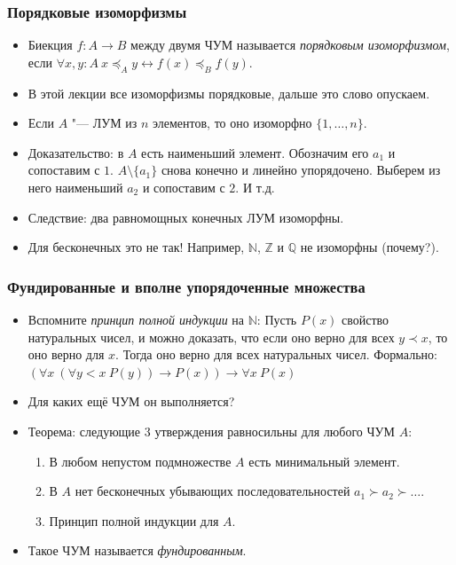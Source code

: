 \documentclass[10pt]{beamer}
\begin{document}
\begin{frame}
    \frametitle{Порядковые изоморфизмы}
\begin{itemize}
    \item Биекция \(f: A \to B\) между двумя ЧУМ называется \emph{порядковым изоморфизмом}, если \( \forall x,y:A ~ x \preccurlyeq_A y \leftrightarrow f(x) \preccurlyeq_B f(y) \).
    \item В этой лекции все изоморфизмы порядковые, дальше это слово опускаем.
    \pause
    \item Если $A$ "--- ЛУМ из $n$ элементов, то оно изоморфно \(\{1,\ldots,n\}\).
    \pause
    \item Доказательство: в $A$ есть наименьший элемент. Обозначим его $a_1$ и сопоставим с $1$. $A \setminus \{a_1\}$ снова конечно и линейно упорядочено. \pause Выберем из него наименьший $a_2$ и сопоставим с $2$. И т.д.
    \pause
    \item Следствие: два равномощных конечных ЛУМ изоморфны.
    \item Для бесконечных это не так! Например, \pause \(\mathbb{N}\), \(\mathbb{Z}\) и \(\mathbb{Q}\) не изоморфны (почему?).
\end{itemize}
\end{frame}

\begin{frame}
    \frametitle{Фундированные и вполне упорядоченные множества}
    \begin{itemize}
        \item Вспомните \emph{принцип полной индукции} на \(\mathbb{N}\): \pause Пусть \(P(x)\) свойство натуральных чисел, и можно доказать, что если оно верно для всех \(y \prec x\), то оно верно для \(x\). Тогда оно верно для всех натуральных чисел. Формально: \( (\forall x ~ (\forall y < x ~ P(y)) \to P(x)) \to \forall x ~ P(x) \)
        \pause
        \item Для каких ещё ЧУМ он выполняется?
        \item Теорема: следующие 3 утверждения равносильны для любого ЧУМ $A$:
        \begin{enumerate}
            \item В любом непустом подмножестве $A$ есть минимальный элемент.
            \item В $A$ нет бесконечных убывающих последовательностей $a_1 \succ a_2 \succ \ldots$.
            \item Принцип полной индукции для $A$.
        \end{enumerate}
        \item Такое ЧУМ называется \emph{фундированным}.
    \end{itemize}
\end{frame}
\end{document}
